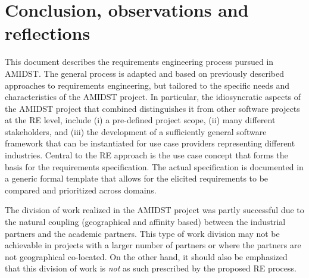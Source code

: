 \section{Conclusion, observations and reflections} 
\label{sec:conclusion}

This document describes the requirements engineering process pursued in AMIDST. The general process is  adapted and based
on previously described approaches to requirements engineering, but tailored to the specific needs and characteristics of the AMIDST
project. In particular, the idiosyncratic aspects of the AMIDST project that combined distinguishes it from other software
projects at the RE level, include (i) a pre-defined project scope, (ii) many different
stakeholders, and (iii) the development of a sufficiently general software framework that can be instantiated for
use case providers representing different industries.  Central to the RE approach is the use case
concept that forms the basis for the requirements specification. The actual specification is documented in a generic
formal template that allows for the elicited requirements to be compared and prioritized across domains. 

The division of work realized in the AMIDST project was partly successful due to the natural coupling (geographical and
affinity based) between the industrial partners and the academic partners. This type of work division may not be
achievable in projects with a larger number of partners or where the partners are not geographical co-located. On the
other hand, it should also be emphasized that this division of work is \emph{not} as such prescribed by the proposed
RE process. 
